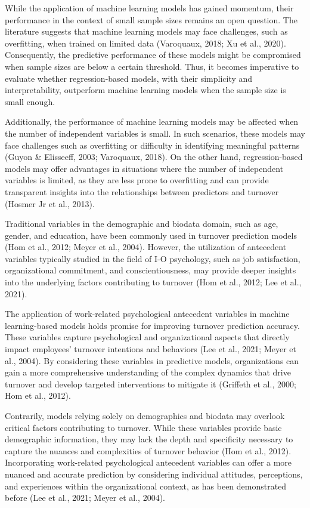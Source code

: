 \documentclass[
  jou]{apa6}
\begin{document}
While the application of machine learning models has gained momentum, their performance in the context of small sample sizes remains an open question.
The literature suggests that machine learning models may face challenges, such as overfitting, when trained on limited data (Varoquaux, 2018; Xu et al., 2020).
Consequently, the predictive performance of these models might be compromised when sample sizes are below a certain threshold.
Thus, it becomes imperative to evaluate whether regression-based models, with their simplicity and interpretability, outperform machine learning models when the sample size is small enough.

Additionally, the performance of machine learning models may be affected when the number of independent variables is small.
In such scenarios, these models may face challenges such as overfitting or difficulty in identifying meaningful patterns (Guyon \& Elisseeff, 2003; Varoquaux, 2018).
On the other hand, regression-based models may offer advantages in situations where the number of independent variables is limited, as they are less prone to overfitting and can provide transparent insights into the relationships between predictors and turnover (Hosmer Jr et al., 2013).

Traditional variables in the demographic and biodata domain, such as age, gender, and education, have been commonly used in turnover prediction models (Hom et al., 2012; Meyer et al., 2004).
However, the utilization of antecedent variables typically studied in the field of I-O psychology, such as job satisfaction, organizational commitment, and conscientiousness, may provide deeper insights into the underlying factors contributing to turnover (Hom et al., 2012; Lee et al., 2021).

The application of work-related psychological antecedent variables in machine learning-based models holds promise for improving turnover prediction accuracy.
These variables capture psychological and organizational aspects that directly impact employees' turnover intentions and behaviors (Lee et al., 2021; Meyer et al., 2004).
By considering these variables in predictive models, organizations can gain a more comprehensive understanding of the complex dynamics that drive turnover and develop targeted interventions to mitigate it (Griffeth et al., 2000; Hom et al., 2012).

Contrarily, models relying solely on demographics and biodata may overlook critical factors contributing to turnover.
While these variables provide basic demographic information, they may lack the depth and specificity necessary to capture the nuances and complexities of turnover behavior (Hom et al., 2012).
Incorporating work-related psychological antecedent variables can offer a more nuanced and accurate prediction by considering individual attitudes, perceptions, and experiences within the organizational context, as has been demonstrated before (Lee et al., 2021; Meyer et al., 2004).
\end{document}
